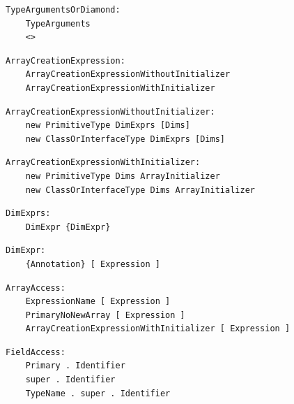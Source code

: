 \noindent\textbf{\texttt{}}\par
\begin{lstlisting}
TypeArgumentsOrDiamond:
    TypeArguments
    <>
\end{lstlisting}

\noindent\textbf{\texttt{}}\par
\begin{lstlisting}
ArrayCreationExpression:
    ArrayCreationExpressionWithoutInitializer
    ArrayCreationExpressionWithInitializer
\end{lstlisting}

\noindent\textbf{\texttt{}}\par
\begin{lstlisting}
ArrayCreationExpressionWithoutInitializer:
    new PrimitiveType DimExprs [Dims]
    new ClassOrInterfaceType DimExprs [Dims]
\end{lstlisting}

\noindent\textbf{\texttt{}}\par
\begin{lstlisting}
ArrayCreationExpressionWithInitializer:
    new PrimitiveType Dims ArrayInitializer
    new ClassOrInterfaceType Dims ArrayInitializer
\end{lstlisting}

\noindent\textbf{\texttt{}}\par
\begin{lstlisting}
DimExprs:
    DimExpr {DimExpr}
\end{lstlisting}

\noindent\textbf{\texttt{}}\par
\begin{lstlisting}
DimExpr:
    {Annotation} [ Expression ]
\end{lstlisting}

\noindent\textbf{\texttt{}}\par
\begin{lstlisting}
ArrayAccess:
    ExpressionName [ Expression ]
    PrimaryNoNewArray [ Expression ]
    ArrayCreationExpressionWithInitializer [ Expression ]
\end{lstlisting}

\noindent\textbf{\texttt{}}\par
\begin{lstlisting}
FieldAccess:
    Primary . Identifier
    super . Identifier
    TypeName . super . Identifier
\end{lstlisting}

